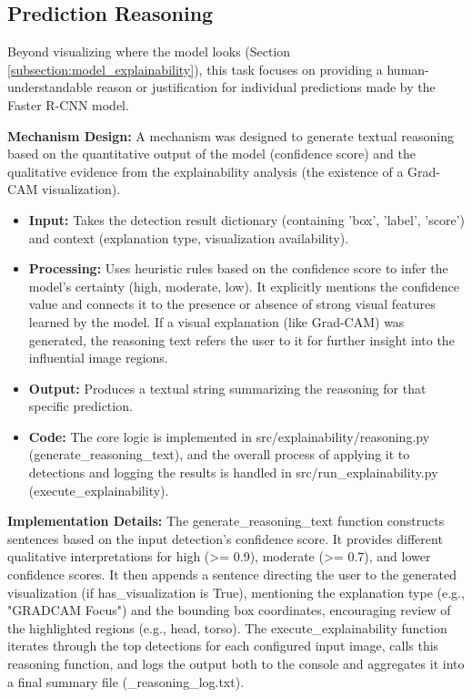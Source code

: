 \subsection{Prediction Reasoning}
\label{subsection:prediction_reasoning}
Beyond visualizing where the model looks (Section \ref{subsection:model_explainability}), this task focuses on providing a human-understandable reason or justification for individual predictions made by the Faster R-CNN model.

\textbf{Mechanism Design:}
A mechanism was designed to generate textual reasoning based on the quantitative output of the model (confidence score) and the qualitative evidence from the explainability analysis (the existence of a Grad-CAM visualization).
\begin{itemize}
    \item   \textbf{Input:} Takes the detection result dictionary (containing 'box', 'label', 'score') and context (explanation type, visualization availability).
    \item   \textbf{Processing:} Uses heuristic rules based on the confidence score to infer the model's certainty (high, moderate, low). It explicitly mentions the confidence value and connects it to the presence or absence of strong visual features learned by the model. If a visual explanation (like Grad-CAM) was generated, the reasoning text refers the user to it for further insight into the influential image regions.
    \item   \textbf{Output:} Produces a textual string summarizing the reasoning for that specific prediction.
    \item   \textbf{Code:} The core logic is implemented in {src/explainability/reasoning.py} ({generate\_reasoning\_text}), and the overall process of applying it to detections and logging the results is handled in {src/run\_explainability.py} ({execute\_explainability}).
\end{itemize}

\textbf{Implementation Details:}
The {generate\_reasoning\_text} function constructs sentences based on the input detection's confidence score. It provides different qualitative interpretations for high (>= 0.9), moderate (>= 0.7), and lower confidence scores. It then appends a sentence directing the user to the generated visualization (if {has\_visualization} is True), mentioning the explanation type (e.g., "GRADCAM Focus") and the bounding box coordinates, encouraging review of the highlighted regions (e.g., head, torso). The {execute\_explainability} function iterates through the top detections for each configured input image, calls this reasoning function, and logs the output both to the console and aggregates it into a final summary file ({\_reasoning\_log.txt}).

